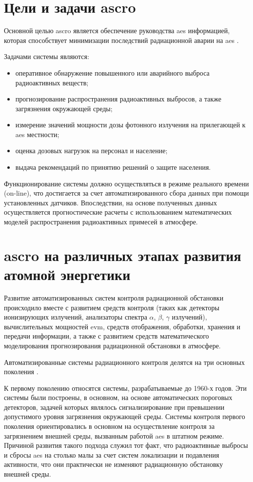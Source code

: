 \section{Цели и задачи \ac{ascro}}

Основной целью \ac{ascro} является обеспечение руководства \ac{aes} информацией, которая способствует минимизации 
последствий радиационной аварии на \ac{aes} \cite{elokhin}.

Задачами системы являются:

\begin{itemize}
	\item оперативное обнаружение повышенного или аварийного выброса радиоактивных веществ;
	\item прогнозирование распространения радиоактивных выбросов, а также загрязнения окружающей среды;
	\item измерение значений мощности дозы фотонного излучения на прилегающей к \ac{aes} местности;
	\item оценка дозовых нагрузок на персонал и население;
	\item выдача рекомендаций по принятию решений о защите населения.
\end{itemize}

Функционирование системы должно осуществляться в режиме реального времени (on-line), что достигается за счет 
автоматизированного сбора данных при помощи установленных датчиков. Впоследствии, на основе полученных данных 
осуществляется прогностические расчеты с использованием математических моделей распространения радиоактивных примесей в 
атмосфере.

\section{\ac{ascro} на различных этапах развития атомной энергетики}

Развитие автоматизированных систем контроля радиационной обстановки происходило вместе с развитием средств контроля
(таких как детекторы ионизирующих излучений, анализаторы спектра $\alpha$, $\beta$, $\gamma$ излучений), вычислительных 
мощностей \ac{evm}, средств отображения, обработки, хранения и передачи информации, а также с развитием средств 
математического моделирования прогнозирования радиационной обстановки в атмосфере.

Автоматизированные системы радиационного контроля делятся на три основных поколения \cite{elokhin}.

К первому поколению относятся системы, разрабатываемые до 1960-х годов. Эти системы были построены, в основном, на 
основе автоматических пороговых детекторов, задачей которых являлось сигнализирование при превышении допустимого уровня 
загрязнения окружающей среды. Системы контроля первого поколения ориентировались в основном на осуществление контроля 
за загрязнением внешней среды, вызванным работой \ac{aes} в штатном режиме. Причиной развития такого подхода служил тот 
факт, что радиоактивные выбросы и сбросы \ac{aes} на столько малы за счет систем локализации и подавления активности, 
что они практически не изменяют радиационную обстановку внешней среды.

